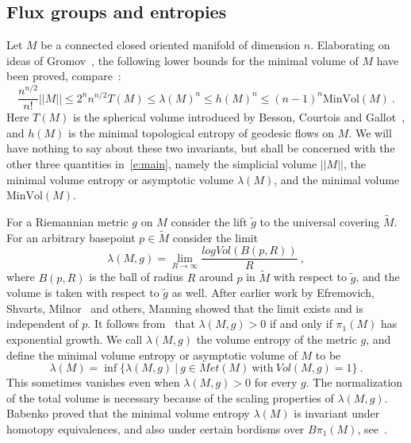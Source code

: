 \documentclass[12pt]{amsart}
\theoremstyle{definition}
\theoremstyle{remark}
\begin{document}
\subsection{Flux groups and entropies} 
Let $M$ be a connected closed oriented manifold of dimension $n$. Elaborating on ideas of Gromov~\cite{Gromov},
the following lower bounds for the minimal volume of $M$ have been proved, compare~\cite{BCG0,entropies,PP}:
\begin{equation}\label{e:main}
    \frac{n^{n/2}}{n!} \vert\vert M \vert\vert \leq 2^{n}n^{n/2} T(M) \leq 
    \lambda(M)^{n}\leq h(M)^{n}\leq (n-1)^{n}\text{MinVol}(M) \ .
    \end{equation}
Here $T(M)$ is the spherical volume introduced by Besson, Courtois and Gallot~\cite{BCG0}, and $h(M)$ is the 
minimal topological entropy of geodesic flows on $M$. We will have nothing to say about these two invariants,
but shall be concerned with the other three quantities in~\eqref{e:main}, namely the simplicial volume $\vert\vert M \vert\vert$, 
the minimal volume entropy or asymptotic volume $\lambda (M)$, and the minimal volume $\text{MinVol}(M)$.

For a Riemannian metric $g$ on $M$ consider the lift $\tilde g$ to the 
universal covering $\tilde M$. For an arbitrary basepoint $p\in\tilde M$ 
consider the limit 
$$
\lambda (M,g) = \lim_{R\to\infty}\frac{log Vol(B(p,R))}{R} \ ,
$$
where $B(p,R)$ is the ball of radius $R$ around $p$ in $\tilde M$ with respect 
to $\tilde g$, and the volume is taken with respect to $\tilde g$ as well. After 
earlier work by Efremovich, Shvarts, Milnor~\cite{Mi} and others, Manning 
showed that the limit exists and is independent of $p$. 
It follows from~\cite{Mi} that $\lambda (M,g)>0$ if and only if $\pi_{1}(M)$ has exponential growth. 
We call $\lambda (M,g)$ the volume entropy of the metric $g$, and define the 
minimal volume entropy or asymptotic volume of $M$ to be 
$$
\lambda (M) = \inf\{\lambda (M,g)\ \vert \  g\in Met(M) \ 
\textrm{with} \ Vol(M,g)=1 \} \ .
$$
This sometimes vanishes even when $\lambda (M,g)>0$ for every $g$.
The normalization of the total volume is necessary because of the 
scaling properties of $\lambda (M,g)$.
Babenko proved that the minimal volume entropy $\lambda (M)$ is invariant
under homotopy equivalences, and also under certain bordisms over $B\pi_1(M)$, 
see~\cite{B1,B2}. 
\end{document}
